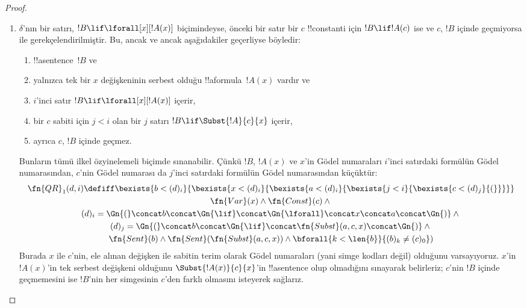 \begin{proof}
\begin{enumerate}
  satırdaki !!{sentence} bir $!A$ formülü, $k$'ıncı satırdaki tümce
  $!A \lif !B$, $i$'inci satırdaki tümce de $!B$ olacak biçimde $j$ ile $k$
  satırları varsa modus ponens ile gerekçelendirilmiştir:
  \begin{multline*}
    \fn{MP}(d, i) \defiff \bexists{j < i}{\bexists{k < i}{}}\\
    (d)_k = \Gn{(} \concat (d)_j
      \concat \Gn{\lif} \concat (d)_i \concat \Gn{)}
  \end{multline*}
  Sınırlı niceleme, birleştirme ve $=$ ilkel özyinelemeli olduğundan bu, ilkel
  özyinelemeli bir bağıntı tanımlar.
\item $\delta$'nın bir satırı, $!B \lif \lforall[x][!A(x)]$ biçimindeyse,
  önceki bir satır bir $c$ !!{constant}{}i için $!B \lif !A(c)$ ise ve $c$,
  $!B$ içinde geçmiyorsa \QR{} ile gerekçelendirilmiştir. Bu, ancak ve ancak
  aşağıdakiler geçerliyse böyledir:
  \begin{enumerate}
  \item !!a{sentence}~$!B$ ve
  \item yalnızca tek bir $x$ değişkeninin serbest olduğu !!a{formula}~$!A(x)$
    vardır ve
  \item $i$'inci satır $!B \lif \lforall[x][!A(x)]$ içerir,
  \item bir $c$ sabiti için $j<i$ olan bir $j$ satırı
    $!B \lif \Subst{!A}{c}{x}$ içerir,
  \item ayrıca $c$, $!B$ içinde geçmez.
  \end{enumerate}
  Bunların tümü ilkel özyinelemeli biçimde sınanabilir. Çünkü $!B$, $!A(x)$
  ve $x$'in Gödel numaraları $i$'inci satırdaki formülün Gödel numarasından,
  $c$'nin Gödel numarası da $j$'inci satırdaki formülün Gödel numarasından
  küçüktür:
  \begin{multline*}
    \fn{QR}_1(d, i) \defiff \bexists{b < (d)_i}{\bexists{x <
        (d)_i}{\bexists{a < (d)_i}{\bexists{j<i}{\bexists{c < (d)_j}{(}}}}}
    \\ \fn{Var}(x) \land \fn{Const}(c) \land {} \\
    (d)_i = \Gn{(} \concat
    b \concat \Gn{\lif} \concat \Gn{\lforall} \concat x \concat a
    \concat \Gn{)} \land {}\\
    (d)_j = \Gn{(} \concat b \concat
    \Gn{\lif} \concat \fn{Subst}(a,c,x) \concat \Gn{)} \land {}\\ \fn{Sent}(b)
    \land \fn{Sent}(\fn{Subst}(a,c,x)) \land {} \bforall{k <
      \len{b}}{(b)_k \neq (c)_0})
  \end{multline*}
  Burada $x$ ile $c$'nin, ele alınan değişken ile sabitin terim olarak Gödel
  numaraları (yani simge kodları değil) olduğunu varsayıyoruz. $x$'in
  $!A(x)$'in tek serbest değişkeni olduğunu $\Subst{!A(x)}{c}{x}$'in
  !!a{sentence} olup olmadığını sınayarak belirleriz; $c$'nin $!B$ içinde
  geçmemesini ise $!B$'nin her simgesinin $c$'den farklı olmasını isteyerek
  sağlarız.


\end{enumerate}
\end{proof}
